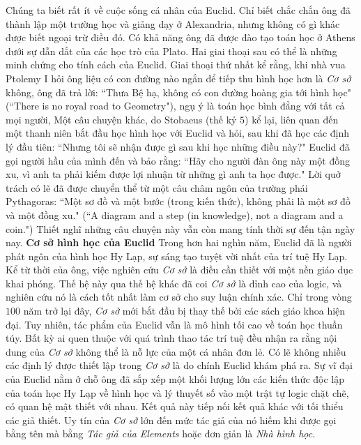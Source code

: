 \begin{multicols}{2}
	\vskip 0.1cm
	Chúng ta biết rất ít về cuộc sống cá nhân của Euclid.  Chỉ biết chắc chắn ông đã thành lập một trường học và giảng dạy ở Alexandria, nhưng không có gì khác được biết ngoại trừ điều đó. Có khả năng ông đã được đào tạo toán học ở Athens dưới sự dẫn dắt của các học trò của Plato. Hai giai thoại sau có thể là những minh chứng cho tính cách của Euclid. Giai thoại thứ nhất kể rằng, khi nhà vua Ptolemy I hỏi ông liệu có con đường nào ngắn để tiếp thu hình học hơn là \textit{Cơ sở} không, ông đã trả lời: ``Thưa Bệ hạ, không có con đường hoàng gia tới hình học" (``There is no royal road to Geometry"), ngụ ý là toán học bình đẳng với tất cả mọi người, Một câu chuyện khác, do Stobaeus (thế kỷ $5$) kể lại, liên quan đến một thanh niên bắt đầu học hình học với Euclid và hỏi, sau khi đã học các định lý đầu tiên: ``Nhưng tôi sẽ nhận được gì sau khi học những điều này?" Euclid đã gọi người hầu của mình đến và bảo rằng: ``Hãy cho người đàn ông này một đồng xu, vì anh ta phải kiếm được lợi nhuận từ những gì anh ta học được." Lời quở trách có lẽ đã được chuyển thể từ một câu châm ngôn của trường phái Pythagoras: ``Một sơ đồ và một bước (trong kiến thức), không phải là một sơ đồ và một đồng xu." (``A diagram and a step (in knowledge), not a diagram and a coin.")  
	Thiết nghĩ những câu chuyện này vẫn còn mang tính thời sự đến tận ngày nay.
	\vskip 0.1cm
	\textbf{\color{lichsutoanhoc}Cơ sở hình học của Euclid}
	\vskip 0.1cm
	Trong hơn hai nghìn năm, Euclid đã là người phát ngôn của hình học Hy Lạp, sự sáng tạo tuyệt vời nhất của trí tuệ Hy Lạp. Kể từ thời của ông, việc nghiên cứu \textit{Cơ sở} là điều cần thiết với một nền giáo dục khai phóng. Thế hệ này qua thế hệ khác đã coi \textit{Cơ sở} là đỉnh cao của logic, và nghiên cứu nó là cách tốt nhất làm cơ sở cho suy luận chính xác.  Chỉ trong vòng $100$ năm trở lại đây, \textit{Cơ sở} mới bắt đầu bị thay thế bởi các sách giáo khoa hiện đại. Tuy nhiên, tác phẩm của Euclid vẫn là mô hình tối cao về toán học thuần túy.
	\vskip 0.1cm
	Bất kỳ ai quen thuộc với quá trình thao tác trí tuệ đều nhận ra rằng nội dung của \textit{Cơ sở} không thể là nỗ lực của một cá nhân đơn lẻ. Có lẽ không nhiều các định lý được thiết lập trong \textit{Cơ sở} là do chính Euclid khám phá ra. Sự vĩ đại của Euclid nằm ở chỗ ông đã sắp xếp một khối lượng lớn các kiến thức độc lập của toán học Hy Lạp về hình học và lý thuyết số vào một trật tự logic chặt chẽ, có quan hệ mật thiết với nhau. Kết quả này tiếp nối kết quả khác với tối thiểu các giả thiết. Uy tín của \textit{Cơ sở} lớn đến mức tác giả của nó hiếm khi được gọi bằng tên mà bằng \textit{Tác giả của Elements} hoặc đơn giản là \textit{Nhà hình học}.

\end{multicols}
